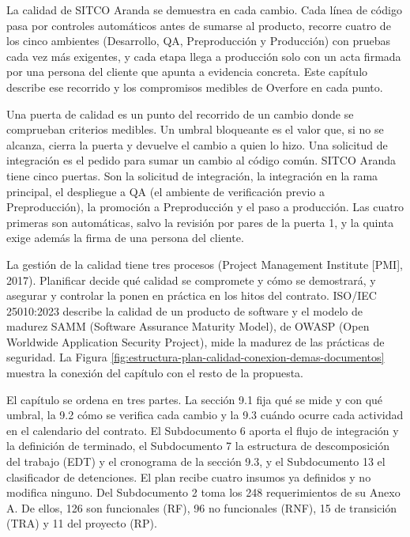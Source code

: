 \documentclass[subdoc]{../../comun/overfore}
\begin{document}
La calidad de SITCO Aranda se demuestra en cada cambio. Cada línea de código pasa por controles automáticos antes de sumarse al producto, recorre cuatro de los cinco ambientes (Desarrollo, QA, Preproducción y Producción) con pruebas cada vez más exigentes, y cada etapa llega a producción solo con un acta firmada por una persona del cliente que apunta a evidencia concreta. Este capítulo describe ese recorrido y los compromisos medibles de Overfore en cada punto.

Una puerta de calidad es un punto del recorrido de un cambio donde se comprueban criterios medibles. Un umbral bloqueante es el valor que, si no se alcanza, cierra la puerta y devuelve el cambio a quien lo hizo. Una solicitud de integración es el pedido para sumar un cambio al código común. SITCO Aranda tiene cinco puertas. Son la solicitud de integración, la integración en la rama principal, el despliegue a QA (el ambiente de verificación previo a Preproducción), la promoción a Preproducción y el paso a producción. Las cuatro primeras son automáticas, salvo la revisión por pares de la puerta 1, y la quinta exige además la firma de una persona del cliente.

La gestión de la calidad tiene tres procesos (Project Management Institute [PMI], 2017). Planificar decide qué calidad se compromete y cómo se demostrará, y asegurar y controlar la ponen en práctica en los hitos del contrato. ISO/IEC 25010:2023 describe la calidad de un producto de software y el modelo de madurez SAMM (Software Assurance Maturity Model), de OWASP (Open Worldwide Application Security Project), mide la madurez de las prácticas de seguridad. La Figura \ref{fig:estructura-plan-calidad-conexion-demas-documentos} muestra la conexión del capítulo con el resto de la propuesta.

El capítulo se ordena en tres partes. La sección 9.1 fija qué se mide y con qué umbral, la 9.2 cómo se verifica cada cambio y la 9.3 cuándo ocurre cada actividad en el calendario del contrato. El Subdocumento 6 aporta el flujo de integración y la definición de terminado, el Subdocumento 7 la estructura de descomposición del trabajo (EDT) y el cronograma de la sección 9.3, y el Subdocumento 13 el clasificador de detenciones. El plan recibe cuatro insumos ya definidos y no modifica ninguno. Del Subdocumento 2 toma los 248 requerimientos de su Anexo A. De ellos, 126 son funcionales (RF), 96 no funcionales (RNF), 15 de transición (TRA) y 11 del proyecto (RP).
\end{document}
